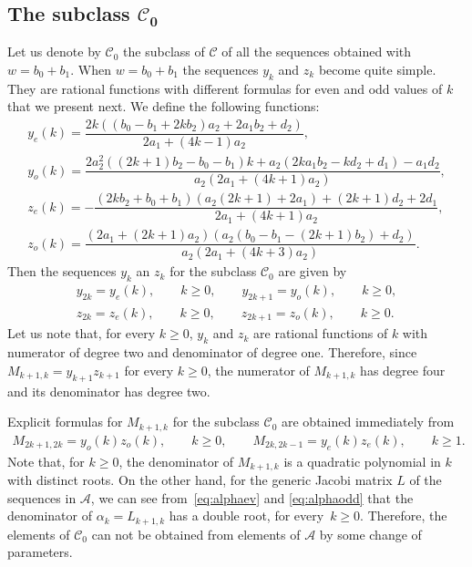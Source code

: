\documentclass[10pt,a4paper]{amsart}
\def\cA{\mathcal A}
\def\cC{\mathcal C}
\numberwithin{equation}{section}
\begin{document}
\subsection[The subclass C\_0]{The subclass $\boldsymbol{\cC_0}$}
Let us denote by $\cC_0$ the subclass of $\cC$ of all the sequences obtained with $w=b_0+b_1$.
When $w=b_0+b_1$ the sequences $y_k$ and $z_k$ become quite simple. They are rational functions with different formulas for even and odd values of $k$ that we present next.
 We define the following functions:
 \begin{gather*}%
	 y_e(k)=\dfrac{2 k ( ( b_0-b_1+ 2 k b_2) a_2 + 2 a_1 b_2 + d_2)}{2 a_1 + (4 k -1) a_2},
\\ %
	y_o(k)=\dfrac{2 a_2^2 ( (2 k+1) b_2 -b_0 -b_1) k +a_2 (2 k a_1 b_2 -k d_2 + d_1) - a_1 d_2 }{ a_2 (2 a_1+ (4k+1) a_2) },
\\ %
	z_e(k)=- \dfrac{(2 k b_2 +b_0+b_1)(a_2 ( 2 k+1) + 2 a_1) + ( 2 k+1) d_2 + 2 d_1}{2 a_1 + ( 4 k+1) a_2},
\\ %
	z_o(k)=\dfrac{ (2 a_1+(2k+1) a_2)( a_2 ( b_0-b_1 - ( 2k+1)b_2) + d_2)}{a_2 ( 2 a_1+ ( 4k +3) a_2)}.
\end{gather*}
Then the sequences $y_k$ an $z_k$ for the subclass $\cC_0$ are given by
\begin{gather*}%
 y_{2k}= y_e(k), \qquad  k\ge 0,\qquad
 y_{2k+1}=y_o(k),\qquad  k\ge 0,  \\
 z_{2k}=z_e(k),\qquad  k\ge 0,\qquad
 z_{2 k+1}=z_o(k), \qquad  k \ge 0.
\end{gather*}
Let us note that, for every $k \ge 0$, $y_k$ and $z_k$ are rational functions of $k$ with numerator of degree two and denominator of degree one.
Therefore, since $M_{k+1,k}= y_{k+1} z_{k+1}$ for every $k\ge 0$, the numerator of $M_{k+1,k}$ has degree four and its denominator has degree two.

Explicit formulas for $M_{k+1,k}$ for the subclass $\cC_0$ are obtained immediately from
\begin{gather*}%
 M_{2k+1,2k}= y_o(k) z_o(k),\qquad  k\ge 0,\qquad
 M_{2k, 2k-1}= y_e(k) z_e(k), \qquad  k\ge 1.
\end{gather*}
Note that, for $k\ge 0$, the denominator of $M_{k+1,k}$ is a quadratic polynomial in $k$ with distinct roots. On the other hand, for the generic Jacobi matrix $L$ of the sequences in $\cA$, we can see from~\eqref{eq:alphaev} and \eqref{eq:alphaodd} that the denominator of $\alpha_k=L_{k+1,k}$ has a double root, for every~${k\ge 0}$. Therefore, the elements of $\cC_0$ can not be obtained from elements of $\cA$ by some change of parameters.
\end{document}
